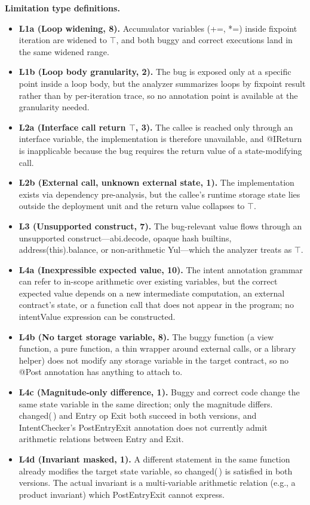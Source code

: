 \documentclass[pdflatex,sn-basic]{sn-jnl}%
\theoremstyle{thmstyleone}%
\theoremstyle{thmstyletwo}%
\theoremstyle{thmstylethree}%
\begin{document}
\smallskip
\noindent\textbf{Limitation type definitions.}
\begin{itemize}
  \item \textbf{L1a (Loop widening, 8).} Accumulator variables (+=, *=) inside fixpoint iteration are widened to $\top$, and both buggy and correct executions land in the same widened range.
  \item \textbf{L1b (Loop body granularity, 2).} The bug is exposed only at a specific point inside a loop body, but the analyzer summarizes loops by fixpoint result rather than by per-iteration trace, so no annotation point is available at the granularity needed.
  \item \textbf{L2a (Interface call return $\top$, 3).} The callee is reached only through an interface variable, the implementation is therefore unavailable, and @IReturn is inapplicable because the bug requires the return value of a state-modifying call.
  \item \textbf{L2b (External call, unknown external state, 1).} The implementation exists via dependency pre-analysis, but the callee's runtime storage state lies outside the deployment unit and the return value collapses to $\top$.
  \item \textbf{L3 (Unsupported construct, 7).} The bug-relevant value flows through an unsupported construct---abi.decode, opaque hash builtins, address(this).balance, or non-arithmetic Yul---which the analyzer treats as $\top$.
  \item \textbf{L4a (Inexpressible expected value, 10).} The intent annotation grammar can refer to in-scope arithmetic over existing variables, but the correct expected value depends on a new intermediate computation, an external contract's state, or a function call that does not appear in the program; no intentValue expression can be constructed.
  \item \textbf{L4b (No target storage variable, 8).} The buggy function (a view function, a pure function, a thin wrapper around external calls, or a library helper) does not modify any storage variable in the target contract, so no @Post annotation has anything to attach to.
  \item \textbf{L4c (Magnitude-only difference, 1).} Buggy and correct code change the same state variable in the same direction; only the magnitude differs. changed(\,) and Entry op Exit both succeed in both versions, and IntentChecker's PostEntryExit annotation does not currently admit arithmetic relations between Entry and Exit.
  \item \textbf{L4d (Invariant masked, 1).} A different statement in the same function already modifies the target state variable, so changed(\,) is satisfied in both versions. The actual invariant is a multi-variable arithmetic relation (e.g., a product invariant) which PostEntryExit cannot express.

\end{itemize}
\end{document}
